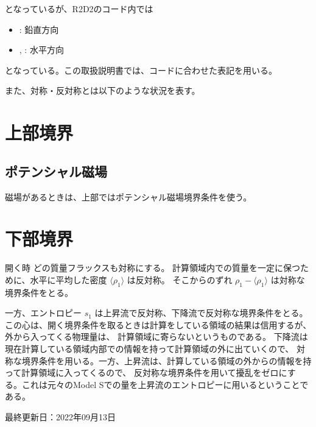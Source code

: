 \documentclass[letterpaper,10pt,dvipdfmx,report]{sphinxmanual}
\let\sphinxpxdimen\pdfpxdimen\else\newdimen\sphinxpxdimen
\begin{document}
\sphinxAtStartPar
となっているが、R2D2のコード内では
\begin{itemize}
\item {} 
\sphinxAtStartPar
{}: 鉛直方向

\item {} 
\sphinxAtStartPar
{}, : 水平方向

\end{itemize}

\sphinxAtStartPar
となっている。この取扱説明書では、コードに合わせた表記を用いる。

\sphinxAtStartPar
また、対称・反対称とは以下のような状況を表す。

\noindent\sphinxincludegraphics[width=450\sphinxpxdimen]{{bc_sym}.png}


\section{上部境界}
\label{\detokenize{boundary:id2}}

\subsection{ポテンシャル磁場}
\label{\detokenize{boundary:id3}}
\sphinxAtStartPar
磁場があるときは、上部ではポテンシャル磁場境界条件を使う。


\section{下部境界}
\label{\detokenize{boundary:id4}}
\sphinxAtStartPar
開く時
どの質量フラックスも対称にする。 計算領域内での質量を一定に保つために、水平に平均した密度
\(\langle \rho_1\rangle\) は反対称。 そこからのずれ
\(\rho_1 - \langle \rho_1 \rangle\) は対称な境界条件をとる。

\sphinxAtStartPar
一方、エントロピー \(s_1\) は上昇流で反対称、下降流で反対称な境界条件をとる。
この心は、開く境界条件を取るときは計算をしている領域の結果は信用するが、外から入ってくる物理量は、
計算領域に寄らないというものである。 下降流は現在計算している領域内部での情報を持って計算領域の外に出ていくので、
対称な境界条件を用いる。一方、上昇流は、計算している領域の外からの情報を持って計算領域に入ってくるので、
反対称な境界条件を用いて擾乱をゼロにする。これは元々のModel Sでの量を上昇流のエントロピーに用いるということである。

\sphinxAtStartPar
最終更新日：2022年09月13日
\end{document}
